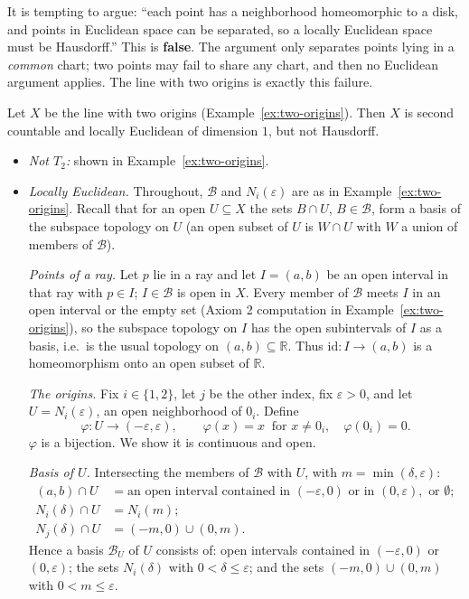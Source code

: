 \documentclass[11pt]{report}
\makeatletter
\newcounter{excounter}[section]
\newcommand{\exlabel}[1]{\edef\@currentlabel{\arabic{section}.\arabic{excounter}}\label{#1}}
\makeatother
\begin{document}
\begin{rembox}\label{rem:exam-trap-locally-euclidean-does-not-imply}
It is tempting to argue: ``each point has a neighborhood homeomorphic to a disk, and points in Euclidean space can be separated, so a locally Euclidean space must be Hausdorff.'' This is \textbf{false}. The argument only separates points lying in a \emph{common} chart; two points may fail to share any chart, and then no Euclidean argument applies. The line with two origins is exactly this failure.
\end{rembox}

\begin{exbox}\exlabel{ex:fails-t2-line-two-origins}
Let $X$ be the line with two origins (Example~\ref{ex:two-origins}). Then $X$ is second countable and locally Euclidean of dimension $1$, but not Hausdorff.
\begin{itemize}
    \item \textit{Not $T_2$:} shown in Example~\ref{ex:two-origins}.
    \item \textit{Locally Euclidean.} Throughout, $\mathcal{B}$ and $N_i(\varepsilon)$ are as in Example~\ref{ex:two-origins}. Recall that for an open $U \subseteq X$ the sets $B \cap U$, $B \in \mathcal{B}$, form a basis of the subspace topology on $U$ (an open subset of $U$ is $W \cap U$ with $W$ a union of members of $\mathcal{B}$).

    \emph{Points of a ray.} Let $p$ lie in a ray and let $I = (a,b)$ be an open interval in that ray with $p \in I$; $I \in \mathcal{B}$ is open in $X$. Every member of $\mathcal{B}$ meets $I$ in an open interval or the empty set (Axiom 2 computation in Example~\ref{ex:two-origins}), so the subspace topology on $I$ has the open subintervals of $I$ as a basis, i.e.\ is the usual topology on $(a,b) \subseteq \mathbb{R}$. Thus $\mathrm{id} : I \to (a,b)$ is a homeomorphism onto an open subset of $\mathbb{R}$.

    \emph{The origins.} Fix $i \in \{1,2\}$, let $j$ be the other index, fix $\varepsilon > 0$, and let $U = N_i(\varepsilon)$, an open neighborhood of $0_i$. Define
    \[
    \varphi : U \to (-\varepsilon, \varepsilon), \qquad \varphi(x) = x \ \text{ for } x \neq 0_i, \quad \varphi(0_i) = 0.
    \]
    $\varphi$ is a bijection. We show it is continuous and open.

    \emph{Basis of $U$.} Intersecting the members of $\mathcal{B}$ with $U$, with $m = \min(\delta, \varepsilon)$:
    \begin{align*}
    (a,b) \cap U &= \text{an open interval contained in } (-\varepsilon, 0) \text{ or in } (0, \varepsilon), \text{ or } \emptyset; \\
    N_i(\delta) \cap U &= N_i(m); \\
    N_j(\delta) \cap U &= (-m, 0) \cup (0, m).
    \end{align*}
    Hence a basis $\mathcal{B}_U$ of $U$ consists of: open intervals contained in $(-\varepsilon,0)$ or $(0,\varepsilon)$; the sets $N_i(\delta)$ with $0 < \delta \le \varepsilon$; and the sets $(-m,0) \cup (0,m)$ with $0 < m \le \varepsilon$.


\end{itemize}
\end{exbox}
\end{document}

